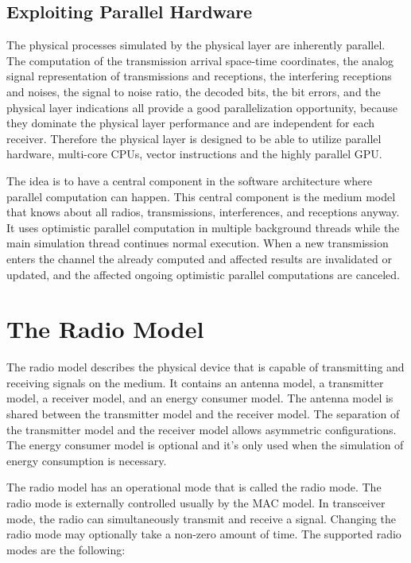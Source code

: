 \subsection{Exploiting Parallel Hardware}

The physical processes simulated by the physical layer are inherently parallel.
The computation of the transmission arrival space-time coordinates, the analog
signal representation of transmissions and receptions, the interfering
receptions and noises, the signal to noise ratio, the decoded bits, the bit
errors, and the physical layer indications all provide a good parallelization
opportunity, because they dominate the physical layer performance and are
independent for each receiver. Therefore the physical layer is designed to be
able to utilize parallel hardware, multi-core CPUs, vector instructions and the
highly parallel GPU.

The idea is to have a central component in the software architecture where
parallel computation can happen. This central component is the medium model
that knows about all radios, transmissions, interferences, and receptions
anyway. It uses optimistic parallel computation in multiple background threads
while the main simulation thread continues normal execution. When a new
transmission enters the channel the already computed and affected results are
invalidated or updated, and the affected ongoing optimistic parallel
computations are canceled.

\section{The Radio Model}

The radio model describes the physical device that is capable of transmitting
and receiving signals on the medium. It contains an antenna model, a transmitter
model, a receiver model, and an energy consumer model. The antenna model is
shared between the transmitter model and the receiver model. The separation of
the transmitter model and the receiver model allows asymmetric configurations.
The energy consumer model is optional and it's only used when the simulation of
energy consumption is necessary.

The radio model has an operational mode that is called the radio mode. The radio
mode is externally controlled usually by the MAC model. In transceiver mode, the
radio can simultaneously transmit and receive a signal. Changing the radio mode
may optionally take a non-zero amount of time. The supported radio modes are the
following:

